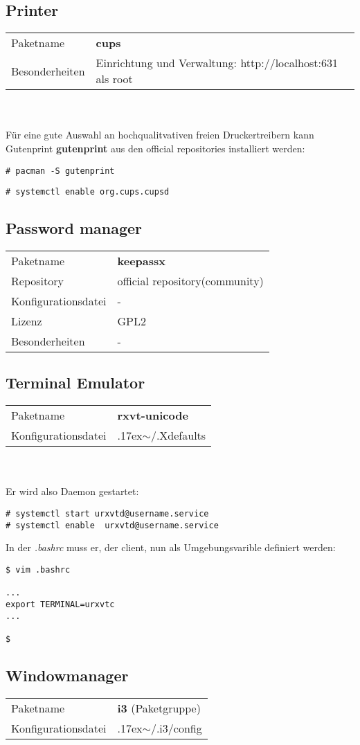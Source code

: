 \subsection{Printer}
\begin{tabular}{l|l}
Paketname & \textbf{cups} \\ 
Besonderheiten & Einrichtung und Verwaltung: http://localhost:631 als root \\
\end{tabular}
\\ \\
Für eine gute Auswahl an hochqualitvativen freien Druckertreibern kann Gutenprint \textbf{gutenprint}
aus den official repositories installiert werden:
\begin{lstlisting}[style=Bash]
# pacman -S gutenprint 
\end{lstlisting}
\begin{lstlisting}[style=Bash]
# systemctl enable org.cups.cupsd 
\end{lstlisting}

\subsection{Password manager}
\begin{tabular}{l|l}
Paketname & \textbf{keepassx} \\ 
Repository & official repository(community) \\
Konfigurationsdatei & - \\
Lizenz & GPL2 \\
Besonderheiten & - \\
\end{tabular}

\subsection{Terminal Emulator}
\begin{tabular}{l|l}
Paketname & \textbf{rxvt-unicode} \\ 
Konfigurationsdatei & {{\raise.17ex\hbox{$\scriptstyle\mathtt{\sim}$}}/.Xdefaults} \\
\end{tabular}
\\ \\
Er wird also Daemon gestartet: 
\begin{lstlisting}[style=Bash]
# systemctl start urxvtd@username.service
# systemctl enable  urxvtd@username.service
\end{lstlisting}
In der \emph{.bashrc} muss er, der client, nun als Umgebungsvarible definiert werden:
\begin{lstlisting}[style=Bash]
$ vim .bashrc 

...
export TERMINAL=urxvtc
...

$
\end{lstlisting}

\subsection{Windowmanager}
\begin{tabular}{l|l}
Paketname & \textbf{i3} (Paketgruppe) \\ 
Konfigurationsdatei & {{\raise.17ex\hbox{$\scriptstyle\mathtt{\sim}$}}/.i3/config} \\
\end{tabular}
